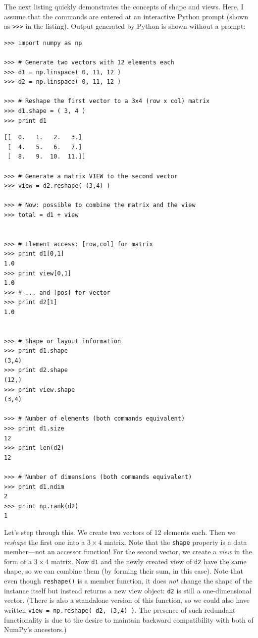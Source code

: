 The next listing quickly demonstrates the concepts of shape and views.
Here, I assume that the commands are entered at an interactive Python
prompt (shown as \texttt{>>>} in the listing).  Output generated by
Python is shown without a prompt:

\begin{verbatim}
>>> import numpy as np

>>> # Generate two vectors with 12 elements each
>>> d1 = np.linspace( 0, 11, 12 )
>>> d2 = np.linspace( 0, 11, 12 )

>>> # Reshape the first vector to a 3x4 (row x col) matrix
>>> d1.shape = ( 3, 4 )
>>> print d1
\end{verbatim}
\begin{verbatim}
[[  0.   1.   2.   3.]
 [  4.   5.   6.   7.]
 [  8.   9.  10.  11.]]

>>> # Generate a matrix VIEW to the second vector
>>> view = d2.reshape( (3,4) )

>>> # Now: possible to combine the matrix and the view
>>> total = d1 + view


>>> # Element access: [row,col] for matrix
>>> print d1[0,1]
1.0
>>> print view[0,1]
1.0
>>> # ... and [pos] for vector
>>> print d2[1]
1.0


>>> # Shape or layout information
>>> print d1.shape
(3,4)
>>> print d2.shape
(12,)
>>> print view.shape
(3,4)

>>> # Number of elements (both commands equivalent)
>>> print d1.size
12
>>> print len(d2)
12

>>> # Number of dimensions (both commands equivalent)
>>> print d1.ndim
2
>>> print np.rank(d2)
1
\end{verbatim}

Let's step through this. We create two vectors of 12 elements each.
Then we \emph{reshape} the first one into a $3 \times 4$ matrix. Note
that the \texttt{shape} property is a data member---not an accessor
function! For the second vector, we create a \emph{view} in the form
of a $3 \times 4$ matrix. Now \texttt{d1} and the newly created view
of \texttt{d2} have the same shape, so we can combine them (by forming
their sum, in this case). Note that even though \texttt{reshape()} is
a member function, it does \emph{not} change the shape of the instance
itself but instead returns a new view object: \texttt{d2} is still a
one-dimensional vector. (There is also a standalone version of this
function, so we could also have written \texttt{view = np.reshape( d2,
  (3,4) )}. The presence of such redundant functionality is due to the
desire to maintain backward compatibility with both of NumPy's
ancestors.)

